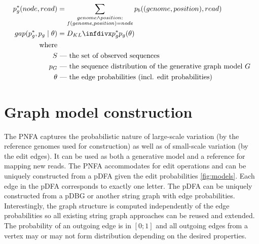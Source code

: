\begin{align*}
	p^*_g(node, read) &= \sum_{\substack{genome \land position: \\f(genome, position)=node}} p_b((genome, position), read) \\
	gap(p^*_g, p_g \mid \theta) &= \kld{p^*_g}{p_g(\theta)} \\
	\text{where}& \\
	S &\text{ --- the set of observed sequences} \\
	p_G &\text{ --- the sequence distribution of the generative graph model $G$} \\
	\theta &\text{ --- the edge probabilities (incl. edit probabilities)}
\end{align*}





\section{Graph model construction}

The PNFA captures the probabilistic nature of large-scale variation (by the reference genomes used for construction) as well as of small-scale variation (by the edit edges). It can be used as both a generative model and a reference for mapping new reads. The PNFA accommodates for edit operations and can be uniquely constructed from a pDFA given the edit probabilities \ref{fig:models}. Each edge in the pDFA corresponds to exactly one letter. The pDFA can be uniquely constructed from a pDBG or another string graph with edge probabilities. Interestingly, the graph structure is computed independently of the edge probabilities so all existing string graph approaches can be reused and extended. The probability of an outgoing edge is in $[0; 1]$ and all outgoing edges from a vertex may or may not form distribution depending on the desired properties.

